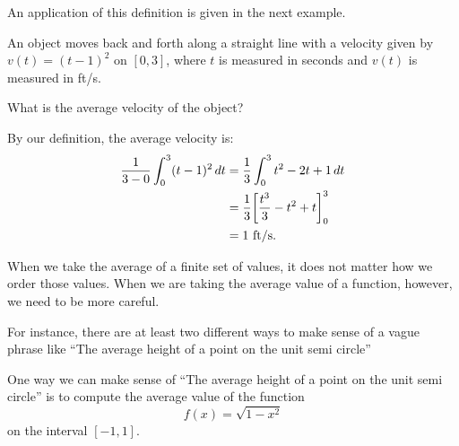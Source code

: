 \documentclass{ximera}
\begin{document}
An application of this definition is given in the next example.


\begin{example}
An object moves back and forth along a straight line with a velocity
given by $v(t) = (t-1)^2$ on $[0,3]$, where $t$ is measured in seconds
and $v(t)$ is measured in ft/s.

What is the average velocity of the object?
\begin{explanation}
By our definition, the average velocity is:
\begin{align*}
\frac{1}{3-0}\int_0^3 (t-1)^2\mathop{}\!d t &=\frac13 \int_0^3 t^2-2t+1\mathop{}\!d t\\
&= \frac13\bigg[ \frac{t^3}{3}-t^2+t \bigg]_0^3\\
&= 1\text{ ft/s}.
\end{align*}
\end{explanation}
\end{example}



When we take the average of a finite set of values, it does not matter
how we order those values.  When we are taking the average value of a
function, however, we need to be more careful.

For instance, there are at least two different ways to make sense of a
vague phrase like ``The average height of a point on the unit semi
circle''
\begin{image}
\end{image}
One way we can make sense of ``The average height of a point on the
unit semi circle'' is to compute the average value of the function
\[
f(x) =\sqrt{1-x^2}
\]
on the interval $[-1,1]$.
\end{document}
